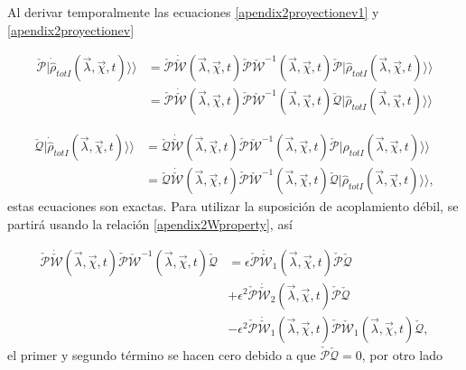 \begin{appendixs}
Al derivar temporalmente las ecuaciones \ref{apendix2proyectionev1} y \ref{apendix2proyectionev} 

\begin{align*}
    \check{\mathcal{P}}|\dot{\hat{\rho}}_{totI}(\vec{\lambda},\vec{\chi},t) \rangle \rangle & = \check{\mathcal{P}}\dot{\check{\mathcal{W}}}(\vec{\lambda},\vec{\chi},t)\check{\mathcal{P}}\check{\mathcal{W}}^{-1}(\vec{\lambda},\vec{\chi},t)\check{\mathcal{P}}|\hat{\rho}_{totI}(\vec{\lambda},\vec{\chi},t)\rangle \rangle \\
     & = \check{\mathcal{P}}\dot{\check{\mathcal{W}}}(\vec{\lambda},\vec{\chi},t)\check{\mathcal{P}}\check{\mathcal{W}}^{-1}(\vec{\lambda},\vec{\chi},t)\check{\mathcal{Q}}|\hat{\rho}_{totI}(\vec{\lambda},\vec{\chi},t)\rangle \rangle 
\end{align*}

\begin{align*}
    \check{\mathcal{Q}}|\dot{\hat{\rho}}_{totI}(\vec{\lambda},\vec{\chi},t) \rangle \rangle & = \check{\mathcal{Q}}\dot{\check{\mathcal{W}}}(\vec{\lambda},\vec{\chi},t)\check{\mathcal{P}}\check{\mathcal{W}}^{-1}(\vec{\lambda},\vec{\chi},t)\check{\mathcal{P}}|\hat{\rho}_{totI}(\vec{\lambda},\vec{\chi},t)\rangle \rangle \\
     & = \check{\mathcal{Q}}\dot{\check{\mathcal{W}}}(\vec{\lambda},\vec{\chi},t)\check{\mathcal{P}}\check{\mathcal{W}}^{-1}(\vec{\lambda},\vec{\chi},t)\check{\mathcal{Q}}|\hat{\rho}_{totI}(\vec{\lambda},\vec{\chi},t)\rangle \rangle, 
\end{align*}
estas ecuaciones son exactas. Para utilizar la suposición de acoplamiento débil, se partirá usando la relación \ref{apendix2Wproperty}, así

\begin{align*}
    \check{\mathcal{P}}\dot{\check{\mathcal{W}}}(\vec{\lambda},\vec{\chi},t)\check{\mathcal{P}}\check{\mathcal{W}}^{-1}(\vec{\lambda},\vec{\chi},t)\check{\mathcal{Q}} & = \epsilon \check{\mathcal{P}}\dot{\check{\mathcal{W}}}_{1}(\vec{\lambda},\vec{\chi},t) \check{\mathcal{P}}\check{\mathcal{Q}} \\
     & + \epsilon^{2} \check{\mathcal{P}}\dot{\check{\mathcal{W}}}_{2}(\vec{\lambda},\vec{\chi},t) \check{\mathcal{P}}\check{\mathcal{Q}} \\
     & - \epsilon^{2}\check{\mathcal{P}}\dot{\check{\mathcal{W}}}_{1}(\vec{\lambda},\vec{\chi},t)\check{\mathcal{P}} \check{\mathcal{W}}_{1}(\vec{\lambda},\vec{\chi},t)\check{\mathcal{Q}},
\end{align*}
el primer y segundo término se hacen cero debido a que $\check{\mathcal{P}}\check{\mathcal{Q}}=0$, por otro lado


\end{appendixs}

